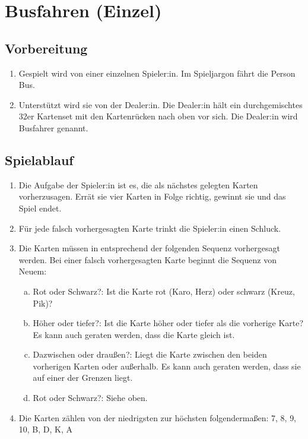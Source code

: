 \chapter{Busfahren (Einzel)}\label{Busfahren_solo}
\section{Vorbereitung}
\begin{enumerate}[label={(\arabic*)}]
    \item
    Gespielt wird von einer einzelnen Spieler:in.
    Im Spieljargon \glqq{}fährt die Person Bus\grqq{}.

    \item
    Unterstützt wird sie von der Dealer:in.
    Die Dealer:in hält ein durchgemischtes 32er Kartenset mit den Kartenrücken nach oben vor sich.
    Die Dealer:in wird \glqq{}Busfahrer\grqq{} genannt.
\end{enumerate}

\section{Spielablauf}
\begin{enumerate}[label={(\arabic*)}]
    \item
    Die Aufgabe der Spieler:in ist es, die als nächstes gelegten Karten vorherzusagen.
    Errät sie vier Karten in Folge richtig, gewinnt sie und das Spiel endet.
    
    \item
    Für jede falsch vorhergesagten Karte trinkt die Spieler:in einen Schluck.
    
    \item
    Die Karten müssen in entsprechend der folgenden Sequenz vorhergesagt werden.
    Bei einer falsch vorhergesagten Karte beginnt die Sequenz von Neuem:

    \begin{enumerate}[a.]
        \item\label{Busfahren_solo:Spielablauf:Fragen:RS}
        Rot oder Schwarz?: Ist die Karte rot (Karo, Herz) oder schwarz (Kreuz, Pik)?
        \item
        Höher oder tiefer?: Ist die Karte höher oder tiefer als die vorherige Karte?
        Es kann auch geraten werden, dass die Karte gleich ist.
        \item
        Dazwischen oder draußen?: Liegt die Karte zwischen den beiden vorherigen Karten oder außerhalb.
        Es kann auch geraten werden, dass sie auf einer der Grenzen liegt.
        \item
        Rot oder Schwarz?: Siehe oben.
    \end{enumerate}

    \item
    Die Karten zählen von der niedrigsten zur höchsten folgendermaßen: 7, 8, 9, 10, B, D, K, A
\end{enumerate}
